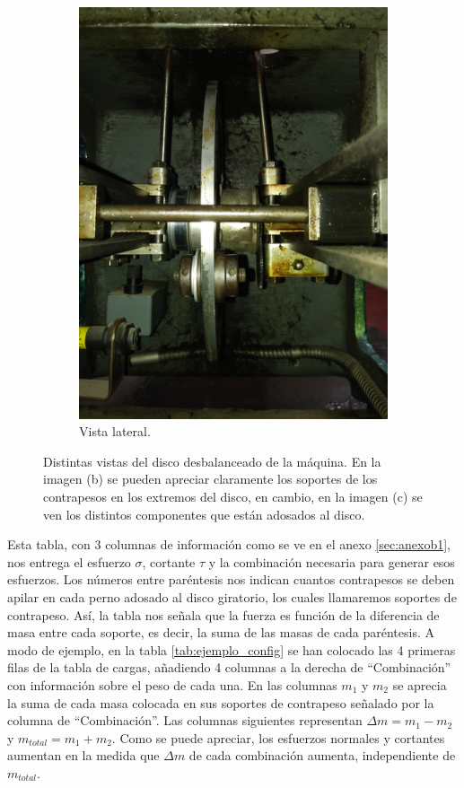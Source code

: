 \begin{figure}[h]
\begin{subfigure}{0.32\linewidth}
		\includegraphics[angle=270, origin=c, width=\linewidth]{Imagenes/disco_lateral.jpg}
		\caption{Vista lateral.}\label{fig:disco_lat}
	\end{subfigure}%
\caption{Distintas vistas del disco desbalanceado de la máquina. En la imagen (b) se pueden apreciar claramente los soportes de los contrapesos en los extremos del disco, en cambio, en la imagen (c) se ven los distintos componentes que están adosados al disco.}
\label{fig:disco_completo}
\end{figure}

Esta tabla, con 3 columnas de información como se ve en el anexo \ref{sec:anexob1}, nos entrega el esfuerzo $\sigma$, cortante $\tau$ y la combinación necesaria para generar esos esfuerzos. Los números entre paréntesis nos indican cuantos contrapesos se deben apilar en cada perno adosado al disco giratorio, los cuales llamaremos soportes de contrapeso. Así, la tabla nos señala que la fuerza es función de la diferencia de masa entre cada soporte, es decir, la suma de las masas de cada paréntesis. A modo de ejemplo, en la tabla \ref{tab:ejemplo_config} se han colocado las 4 primeras filas de la tabla de cargas, añadiendo 4 columnas a la derecha de ``Combinación'' con información sobre el peso de cada una. En las columnas $m_1$ y $m_2$ se aprecia la suma de cada masa colocada en sus soportes de contrapeso señalado por la columna de ``Combinación''. Las columnas siguientes representan $\Delta m = m_1-m_2$ y $m_{total}=m_1+m_2$. Como se puede apreciar, los esfuerzos normales y cortantes aumentan en la medida que $\Delta m$ de cada combinación aumenta, independiente de $m_{total}$.

